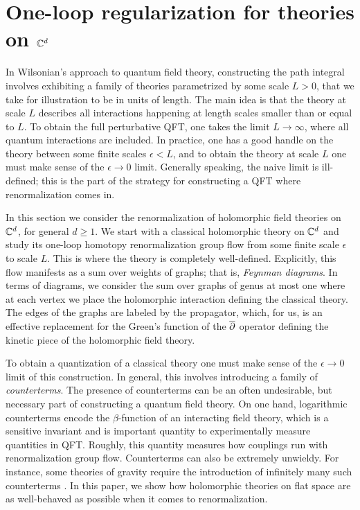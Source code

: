 \documentclass[10pt]{amsart}
\begin{document}
\section{One-loop regularization for theories on $\mathbb C^d$} \label{sec: hol renorm}

In Wilsonian's approach to quantum field theory, constructing the path integral involves exhibiting a family of theories parametrized by some scale $L > 0$, that we take for illustration to be in units of length. 
The main idea is that the theory at scale $L$ describes all interactions happening at length scales smaller than or equal to $L$. 
To obtain the full perturbative QFT, one takes the limit $L \to \infty$, where all quantum interactions are included. 
In practice, one has a good handle on the theory between some finite scales $\epsilon < L$, and to obtain the theory at scale $L$ one must make sense of the $\epsilon \to 0$ limit. 
Generally speaking, the naive limit is ill-defined; this is the part of the strategy for constructing a QFT where renormalization comes in. 

In this section we consider the renormalization of holomorphic field theories on $\mathbb C^d$, for general $d \geq 1$. 
We start with a classical holomorphic theory on $\mathbb C^d$ and study its one-loop homotopy renormalization group flow from some finite scale $\epsilon$ to scale $L$.
This is where the theory is completely well-defined. 
Explicitly, this flow manifests as a sum over weights of graphs; that is, {\em Feynman diagrams}.
In terms of diagrams, we consider the sum over graphs of genus at most one where at each vertex we place the holomorphic interaction defining the classical theory.
The edges of the graphs are labeled by the propagator, which, for us, is an effective replacement for the Green's function of the $\overline{\partial}$ operator defining the kinetic piece of the holomorphic field theory.

To obtain a quantization of a classical theory one must make sense of the $\epsilon \to 0$ limit of this construction. 
In general, this involves introducing a family of {\em counterterms}.
The presence of counterterms can be an often undesirable, but necessary part of constructing a quantum field theory.
On one hand, logarithmic counterterms encode the $\beta$-function of an interacting field theory, which is a sensitive invariant and is important quantity to experimentally measure quantities in QFT.
Roughly, this quantity measures how couplings run with renormalization group flow. 
Counterterms can also be extremely unwieldy. 
For instance, some theories of gravity require the introduction of infinitely many such counterterms \cite{THooftVelt}.
In this paper, we show how holomorphic theories on flat space are as well-behaved as possible when it comes to renormalization. 
\end{document}
